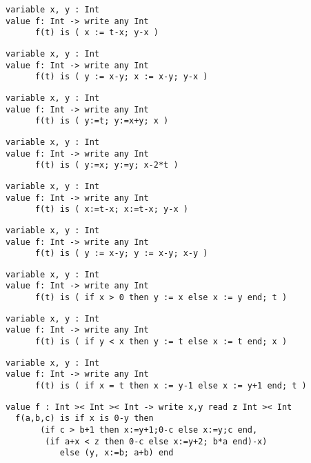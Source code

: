 \z \begin{lstlisting}
variable x, y : Int
value f: Int -> write any Int
      f(t) is ( x := t-x; y-x )
\end{lstlisting}

\z \begin{lstlisting}
variable x, y : Int
value f: Int -> write any Int
      f(t) is ( y := x-y; x := x-y; y-x )
\end{lstlisting}

\z \begin{lstlisting}
variable x, y : Int
value f: Int -> write any Int
      f(t) is ( y:=t; y:=x+y; x )
\end{lstlisting}

\z \begin{lstlisting}
variable x, y : Int
value f: Int -> write any Int
      f(t) is ( y:=x; y:=y; x-2*t )
\end{lstlisting}

\z \begin{lstlisting}
variable x, y : Int
value f: Int -> write any Int
      f(t) is ( x:=t-x; x:=t-x; y-x )
\end{lstlisting}

\z \begin{lstlisting}
variable x, y : Int
value f: Int -> write any Int
      f(t) is ( y := x-y; y := x-y; x-y )
\end{lstlisting}

\z \begin{lstlisting}
variable x, y : Int
value f: Int -> write any Int
      f(t) is ( if x > 0 then y := x else x := y end; t )
\end{lstlisting}

\z \begin{lstlisting}
variable x, y : Int
value f: Int -> write any Int
      f(t) is ( if y < x then y := t else x := t end; x )
\end{lstlisting}

\z \begin{lstlisting}
variable x, y : Int
value f: Int -> write any Int
      f(t) is ( if x = t then x := y-1 else x := y+1 end; t )
\end{lstlisting}

\z \begin{lstlisting}
value f : Int >< Int >< Int -> write x,y read z Int >< Int
  f(a,b,c) is if x is 0-y then
       (if c > b+1 then x:=y+1;0-c else x:=y;c end,
        (if a+x < z then 0-c else x:=y+2; b*a end)-x)
           else (y, x:=b; a+b) end
\end{lstlisting}

